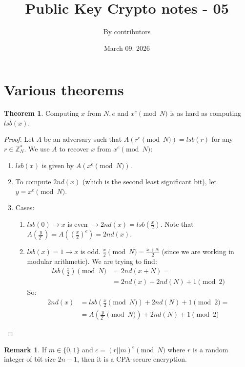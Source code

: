 \documentclass[11pt]{article}
\theoremstyle{definition}
\newtheorem{theorem}{Theorem}[section]
\newtheorem{remark}{Remark}[section]
\theoremstyle{proof}
\begin{document}
	
	\title{Public Key Crypto notes - 05}
	\author{By contributors}
	\date{March 09. 2026}
	\maketitle
	
	\section{Various theorems}
	
	\begin{theorem}
		Computing $x$ from $N, e$ and $x^e \pmod{N}$ is as hard as computing $lsb(x)$.
	\end{theorem}
	
	\begin{proof}
		Let $A$ be an adversary such that $A(r^e \pmod{N}) = lsb(r)$ for any $r \in \mathbb{Z}_N^*$. We use $A$ to recover $x$ from $x^e \pmod{N}$:
		\begin{enumerate}
			\item $lsb(x)$ is given by $A(x^e \pmod{N})$.
			\item To compute $2nd(x)$ (which is the second least significant bit), let $y = x^e \pmod{N}$.
			\item Cases:
			\begin{enumerate}
				\item $lsb(0) \rightarrow x$ is even $\rightarrow 2nd(x) = lsb(\frac{x}{2})$. Note that $A(\frac{y}{2^e}) = A((\frac{x}{2})^e) = 2nd(x)$.
				\item $lsb(x) = 1 \rightarrow x$ is odd. $\frac{x}{2} \pmod{N} = \frac{x+N}{2}$ (since we are working in modular arithmetic). We are trying to find:
				\begin{align}
					lsb(\frac{x}{2}) \pmod{N} &= 2nd(x+N) = \\
					&= 2nd(x) + 2nd(N) + 1 \pmod{2}
				\end{align}
				So:
				\begin{align}
					2nd(x) &= lsb(\frac{x}{2} \pmod{N}) + 2nd(N) + 1 \pmod{2} = \\
					&= A(\frac{y}{2^e} \pmod{N}) + 2nd(N) + 1 \pmod{2}
				\end{align}
			\end{enumerate}
		\end{enumerate}
	\end{proof}
	
	\begin{remark}
		If $m \in \{0, 1\}$ and $c = (r || m)^e \pmod{N}$ where $r$ is a random integer of bit size $2n-1$, then it is a CPA-secure encryption.
	\end{remark}
	
\end{document}
